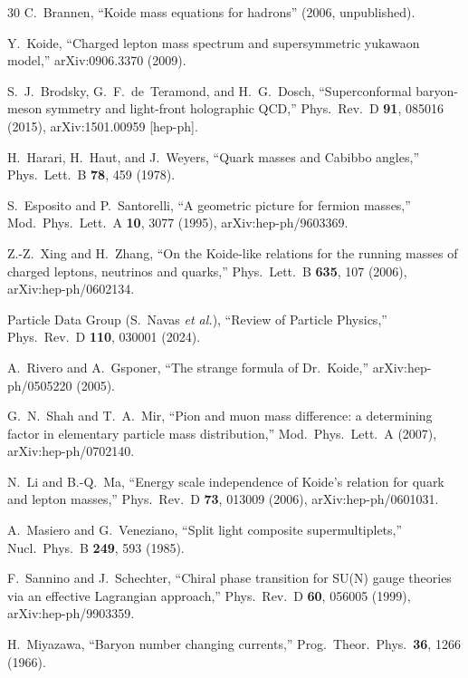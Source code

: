 \documentclass[prd,twocolumn,superscriptaddress,nofootinbib]{revtex4-2}
\begin{document}
\begin{thebibliography}{30}
C.~Brannen,
``Koide mass equations for hadrons'' (2006, unpublished).

Y.~Koide,
``Charged lepton mass spectrum and supersymmetric yukawaon model,''
arXiv:0906.3370 (2009).

S.~J.~Brodsky, G.~F.~de~Teramond, and H.~G.~Dosch,
``Superconformal baryon-meson symmetry and light-front holographic QCD,''
Phys.\ Rev.\ D \textbf{91}, 085016 (2015),
arXiv:1501.00959 [hep-ph].

H.~Harari, H.~Haut, and J.~Weyers,
``Quark masses and Cabibbo angles,''
Phys.\ Lett.\ B \textbf{78}, 459 (1978).

S.~Esposito and P.~Santorelli,
``A geometric picture for fermion masses,''
Mod.\ Phys.\ Lett.\ A \textbf{10}, 3077 (1995),
arXiv:hep-ph/9603369.

Z.-Z.~Xing and H.~Zhang,
``On the Koide-like relations for the running masses of charged leptons,
neutrinos and quarks,''
Phys.\ Lett.\ B \textbf{635}, 107 (2006),
arXiv:hep-ph/0602134.

Particle Data Group (S.~Navas \textit{et al.}),
``Review of Particle Physics,''
Phys.\ Rev.\ D \textbf{110}, 030001 (2024).

A.~Rivero and A.~Gsponer,
``The strange formula of Dr.\ Koide,''
arXiv:hep-ph/0505220 (2005).

G.~N.~Shah and T.~A.~Mir,
``Pion and muon mass difference: a determining factor in elementary
particle mass distribution,''
Mod.\ Phys.\ Lett.\ A (2007),
arXiv:hep-ph/0702140.

N.~Li and B.-Q.~Ma,
``Energy scale independence of Koide's relation for quark and lepton masses,''
Phys.\ Rev.\ D \textbf{73}, 013009 (2006),
arXiv:hep-ph/0601031.

A.~Masiero and G.~Veneziano,
``Split light composite supermultiplets,''
Nucl.\ Phys.\ B \textbf{249}, 593 (1985).

F.~Sannino and J.~Schechter,
``Chiral phase transition for SU(N) gauge theories via an effective
Lagrangian approach,''
Phys.\ Rev.\ D \textbf{60}, 056005 (1999),
arXiv:hep-ph/9903359.

H.~Miyazawa,
``Baryon number changing currents,''
Prog.\ Theor.\ Phys.\ \textbf{36}, 1266 (1966).

\end{thebibliography}
\end{document}
